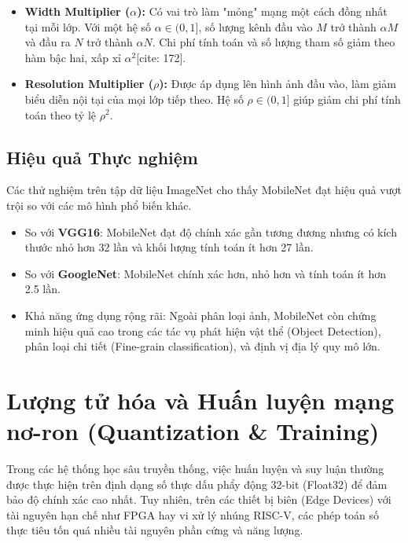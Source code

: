 \begin{itemize}
    \item \textbf{Width Multiplier ($\alpha$):} Có vai trò làm "mỏng" mạng một cách 
    đồng nhất tại mỗi lớp. 
    Với một hệ số $\alpha \in (0, 1]$, số lượng kênh đầu vào $M$ trở thành $\alpha M$ 
    và đầu ra $N$ trở thành $\alpha N$. Chi phí tính toán và số lượng tham số giảm 
    theo hàm bậc hai, xấp xỉ $\alpha^2$[cite: 172].
    \item \textbf{Resolution Multiplier ($\rho$):} Được áp dụng lên hình ảnh đầu vào, 
    làm giảm biểu diễn nội tại của mọi lớp tiếp theo. Hệ số $\rho \in (0, 1]$ giúp giảm 
    chi phí tính toán theo tỷ lệ $\rho^2$.
\end{itemize}

\subsection{Hiệu quả Thực nghiệm}
Các thử nghiệm trên tập dữ liệu ImageNet cho thấy MobileNet đạt hiệu quả vượt trội so với 
các mô hình phổ biến khác.
\begin{itemize}
    \item So với \textbf{VGG16}: MobileNet đạt độ chính xác gần tương đương nhưng có kích 
    thước nhỏ hơn 32 lần và khối lượng tính toán ít hơn 27 lần.
    \item So với \textbf{GoogleNet}: MobileNet chính xác hơn, nhỏ hơn và tính toán ít hơn 2.5 lần.
    \item Khả năng ứng dụng rộng rãi: Ngoài phân loại ảnh, MobileNet còn chứng minh hiệu 
    quả cao trong các tác vụ phát hiện vật thể (Object Detection), phân loại chi tiết 
    (Fine-grain classification), và định vị địa lý quy mô lớn.
\end{itemize}



\section{Lượng tử hóa và Huấn luyện mạng nơ-ron (Quantization \& Training)}
\label{sec:quantization_theory}

Trong các hệ thống học sâu truyền thống, việc huấn luyện và suy luận thường được 
thực hiện trên định dạng số thực dấu phẩy động 32-bit (Float32) để đảm bảo độ chính xác cao nhất. Tuy nhiên, trên các thiết bị biên (Edge Devices) với tài nguyên hạn chế như FPGA hay vi xử lý nhúng RISC-V, các phép toán số thực tiêu tốn quá nhiều tài nguyên phần cứng và năng lượng.

